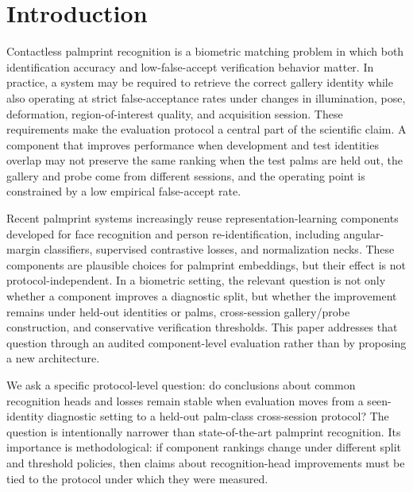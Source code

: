 \section{Introduction}

Contactless palmprint recognition is a biometric matching problem in which both identification accuracy and low-false-accept verification behavior matter. In practice, a system may be required to retrieve the correct gallery identity while also operating at strict false-acceptance rates under changes in illumination, pose, deformation, region-of-interest quality, and acquisition session. These requirements make the evaluation protocol a central part of the scientific claim. A component that improves performance when development and test identities overlap may not preserve the same ranking when the test palms are held out, the gallery and probe come from different sessions, and the operating point is constrained by a low empirical false-accept rate.

Recent palmprint systems increasingly reuse representation-learning components developed for face recognition and person re-identification, including angular-margin classifiers, supervised contrastive losses, and normalization necks. These components are plausible choices for palmprint embeddings, but their effect is not protocol-independent. In a biometric setting, the relevant question is not only whether a component improves a diagnostic split, but whether the improvement remains under held-out identities or palms, cross-session gallery/probe construction, and conservative verification thresholds. This paper addresses that question through an audited component-level evaluation rather than by proposing a new architecture.

We ask a specific protocol-level question: do conclusions about common recognition heads and losses remain stable when evaluation moves from a seen-identity diagnostic setting to a held-out palm-class cross-session protocol? The question is intentionally narrower than state-of-the-art palmprint recognition. Its importance is methodological: if component rankings change under different split and threshold policies, then claims about recognition-head improvements must be tied to the protocol under which they were measured.

